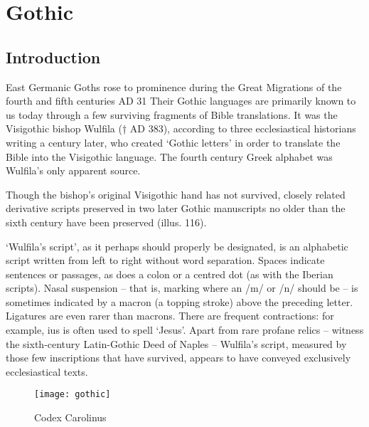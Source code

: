 \def\codex#1{\emph{Codex #1}\index{codex>#1}}
\section{Gothic}

\label{s:gothic}

\subsection{Introduction}

East Germanic Goths rose to prominence during the Great
Migrations of the fourth and fifth centuries AD 31 Their Gothic
languages are primarily known to us today through a few surviving
fragments of Bible translations. It was the Visigothic bishop
Wulfila († AD 383), according to three ecclesiastical historians
writing a century later, who created ‘Gothic letters’ in order to
translate the Bible into the Visigothic language. The fourth century
Greek alphabet was Wulfila’s only apparent source.

Though the bishop’s original Visigothic hand has not survived,
closely related derivative scripts preserved in two later Gothic
manuscripts no older than the sixth century have been preserved
(illus. 116).

‘Wulfila’s script’, as it perhaps should properly be designated,
is an alphabetic script written from left to right without word
separation. Spaces indicate sentences or passages, as does a
colon or a centred dot (as with the Iberian scripts). Nasal suspension
– that is, marking where an /m/ or /n/ should be – is
sometimes indicated by a macron (a topping stroke) above the
preceding letter. Ligatures are even rarer than macrons. There
are frequent contractions: for example, ius is often used to spell
‘Jesus’. Apart from rare profane relics – witness the sixth-century
Latin-Gothic Deed of Naples – Wulfila’s script, measured
by those few inscriptions that have survived, appears to have
conveyed exclusively ecclesiastical texts.

\begin{figure}[htb]
\texttt{[image: gothic]}
\caption{Codex Carolinus}
\end{figure}


